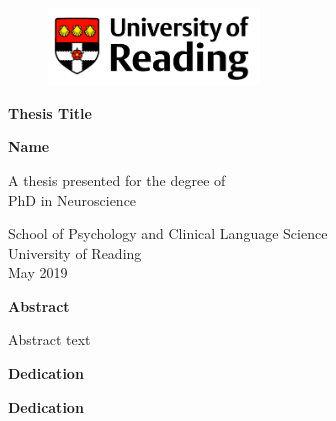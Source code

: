\documentclass[11pt,twoside]{report} %
\begin{document}

\begin{figure}[t]
\includegraphics[width=0.5\textwidth]{reading_logo.png} %
\centering
\end{figure}

\begin{titlepage}
\begin{center}
  \vspace*{1cm}
 
   \Large
   \textbf{Thesis Title}
   
   \vspace{1.5 cm}
   \textbf{Name}
   
   \vspace{3 cm} %
    A thesis presented for the degree of\\
    PhD in Neuroscience
  
   \vspace{2 cm} %
   \Large
   School of Psychology and Clinical Language Science\\
   University of Reading\\
   May 2019
\end{center}
\end{titlepage}


\newpage
\thispagestyle{plain}
\begin{center}
    \Huge
    \textbf{Abstract}
    
    \vspace{1cm}
    \large
    Abstract text 
\end{center}
 
\newpage
\thispagestyle{plain}
\begin{center}
    \Huge
    \textbf{Dedication}  
    
    \vspace{1cm}
    \Large
    \textbf{Dedication}
\end{center}
 
\end{document}
